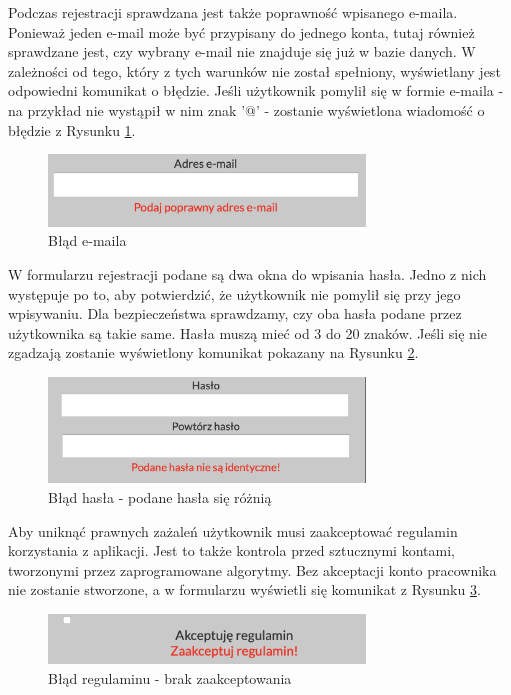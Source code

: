 \documentclass[eng,printmode,openany,oneside]{mgr}
\begin{document}
Podczas rejestracji sprawdzana jest także poprawność wpisanego e-maila. Ponieważ jeden e-mail może być przypisany do jednego konta, tutaj również sprawdzane jest, czy wybrany e-mail nie znajduje się już w bazie danych. W zależności od tego, który z tych warunków nie został spełniony, wyświetlany jest odpowiedni komunikat o błędzie. Jeśli użytkownik pomylił się w formie e-maila - na przykład nie wystąpił w nim znak '@' - zostanie wyświetlona wiadomość o błędzie z Rysunku \ref{fig:11}.
	
	\begin{figure}[H]
		\centering
		\includegraphics[width=0.75\textwidth]{rejestracja_email}
		\caption{Błąd e-maila}
		\label{fig:11}
	\end{figure}
	
W formularzu rejestracji podane są dwa okna do wpisania hasła. Jedno z nich występuje po to, aby potwierdzić, że użytkownik nie pomylił się przy jego wpisywaniu. Dla bezpieczeństwa sprawdzamy, czy oba hasła podane przez użytkownika są takie same. Hasła muszą mieć od 3 do 20 znaków. Jeśli się nie zgadzają zostanie wyświetlony komunikat pokazany na Rysunku \ref{fig:12}.
	
	\begin{figure}[H]
		\centering
		\includegraphics[width=0.75\textwidth]{rejestracja_haslo}
		\caption{Błąd hasła - podane hasła się różnią}
		\label{fig:12}
	\end{figure}

Aby uniknąć prawnych zażaleń użytkownik musi zaakceptować regulamin korzystania z aplikacji. Jest to także kontrola przed sztucznymi kontami, tworzonymi przez zaprogramowane algorytmy. Bez akceptacji konto pracownika nie zostanie stworzone, a w formularzu wyświetli się komunikat z Rysunku \ref{fig:13}.
	
	\begin{figure}[H]
		\centering
		\includegraphics[width=0.75\textwidth]{rejestracja_regulamin}
		\caption{Błąd regulaminu - brak zaakceptowania}
		\label{fig:13}
	\end{figure}
	
\end{document}
